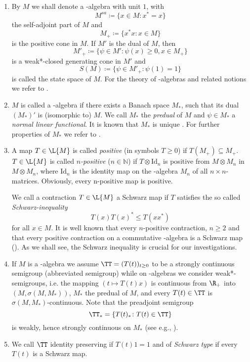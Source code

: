 \begin{enumerate}[1., wide, labelsep=1em, itemindent=\parindent]

\item
By $ M $ we shall denote a \CA-algebra with unit $ 1 $, with 
%
\[
	M^{sa} \coloneqq \{x \in M \colon x^{*} = x\} 
\]
%
the self-adjoint part of $ M $ and 
%
\[
	M_{+} \coloneqq \{ x^{*}x \colon x \in M\} 
\]
%
is the positive cone in $ M $.
If $ M' $ is the dual of $ M $, then 
%
\[
	M'_{+} \coloneqq \{\psi \in M' \colon \psi(x) \geq 0, x \in M_{+}\} 
\]
%
is a weak*-closed generating cone in $ M' $ and 
%
\[
	S(M) \coloneqq \{\psi \in M'_{+}: \psi(1) = 1\} 
\]
%
is called the state space of $ M $. 
For the theory of \CA-algebras and related notions we refer to \citet{pedersen:1979}.

\item
$ M $ is called a \WA-algebra if there exists a Banach space $ M_{*} $, such that its dual $ (M_{*})' $ is (isomorphic to) $ M $.
We call $ M_{*} $ the \emph{predual} of $ M $ and $ \psi \in M_{*} $ a \emph{normal linear functional}.
It is known that $ M_{*} $ is unique \cite[1.13.3]{sakai:1971}.
For further properties of $ M_{*} $ we refer to \cite[Chapter III]{takesaki:1979}.
\newpage
\item
A map $ T \in \L{M} $ is called \emph{positive} (in symbols $ T \geq 0 $) if $ T(M_{+}) \subseteq M_{+} $.
$ T \in \L{M} $ is called \emph{$n$-positive} ($ n \in \mathbb{N} $) if $ T \otimes \text{Id}_{n} $ is positive from $ M \otimes M_{n} $ in $ M \otimes M_{n} $, where $ \text{Id}_{n} $ is the identity map on the \CA-algebra $ M_{n} $ of all $ n \times n $-matrices.
Obviously, every n-positive map is positive.

We call a contraction $ T \in \L{M} $ a Schwarz map if $ T $ satisfies the so called \emph{Schwarz-inequality}
\[
	T(x)T(x)^{*} \leq T(xx^{*}) 
\]
for all $ x \in M $.
It is well known that every $n$-positive contraction, $ n \geq 2 $ and that every positive contraction on a commutative \CA-algebra is a Schwarz map (\cite[Corollary IV. 3.8.]{takesaki:1979}).
As we shall see, the Schwarz inequality is crucial for our investigations.

\item 
If $ M $ is a \CA-algebra we assume $ \TT = (T(t))_{t \geq 0} $ to be a strongly continuous semigroup (abbreviated semigroup) while on \WA-algebras we consider weak*-semigroups, i.e. the mapping $ (t \mapsto T(t)x) $ is continuous from $ \R_{+} $ into $ (M,\sigma(M,M_{*})) $, $ M_{*} $ the predual of $ M $, and every $ T(t) \in \TT $ is $ \sigma(M,M_{*}) $-continuous.
Note that the preadjoint semigroup
\[
	\TT_{*} = \{ T(t)_{*} \colon T(t) \in \TT \}
\]
is weakly, hence strongly continuous on $ M_{*} $ (see e.g., \cite[Prop. 1.23]{davies:1980}).

\item
We call $ \TT $ identity preserving if $ T(t)1 = 1 $ and of \emph{Schwarz type} if every $ T(t) $ is a Schwarz map.

\end{enumerate}
